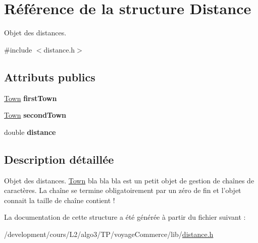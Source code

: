\hypertarget{structDistance}{
\section{Référence de la structure Distance}
\label{structDistance}
}


Objet des distances.  




{\ttfamily \#include $<$distance.h$>$}

\subsection*{Attributs publics}
\begin{DoxyCompactItemize}
\item 
\hypertarget{structDistance_a619a6ef491d8538423e056dda49b72d2}{
\hyperlink{structTown}{Town} {\bfseries firstTown}}
\label{structDistance_a619a6ef491d8538423e056dda49b72d2}

\item 
\hypertarget{structDistance_aed7e33174b78e759a6be730017bc60ab}{
\hyperlink{structTown}{Town} {\bfseries secondTown}}
\label{structDistance_aed7e33174b78e759a6be730017bc60ab}

\item 
\hypertarget{structDistance_a6cd9b7d2a0b38abc488a875aee005538}{
double {\bfseries distance}}
\label{structDistance_a6cd9b7d2a0b38abc488a875aee005538}

\end{DoxyCompactItemize}


\subsection{Description détaillée}
Objet des distances. \hyperlink{structTown}{Town} bla bla bla est un petit objet de gestion de chaînes de caractères. La chaîne se termine obligatoirement par un zéro de fin et l'objet connait la taille de chaîne contient ! 

La documentation de cette structure a été générée à partir du fichier suivant :\begin{DoxyCompactItemize}
\item 
/development/cours/L2/algo3/TP/voyageCommerce/lib/\hyperlink{distance_8h}{distance.h}\end{DoxyCompactItemize}
